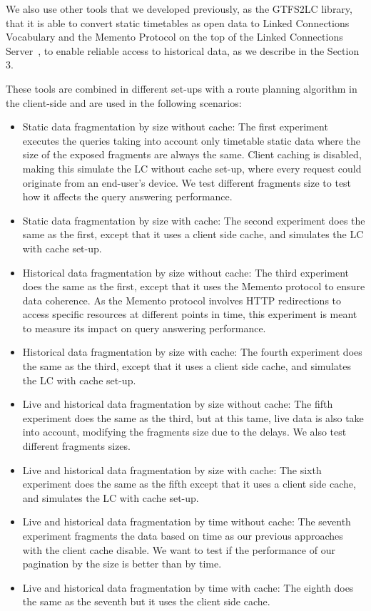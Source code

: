 \documentclass[sw]{iosart2x}
\begin{document}
	We also use other tools that we developed previously, as the GTFS2LC library, that it is able to convert static timetables as open data to Linked Connections Vocabulary and the Memento Protocol on the top of the Linked Connections Server~\cite{rojas2017providing}, to enable reliable access to historical data, as we describe in the Section 3.
	
	These tools are combined in different set-ups with a route planning algorithm in the client-side and are used in the following scenarios:
	\begin{itemize}
	\item Static data fragmentation by size without cache: The first experiment executes the queries taking into account only timetable static data where the size of the exposed fragments are always the same. Client caching is disabled, making this simulate the LC without cache set-up, where every request could originate from an end-user's device. We test different fragments size to test how it affects the query answering performance.
	\item Static data fragmentation by size with cache: The second experiment does the same as the first, except that it uses a client side cache, and simulates the LC with cache set-up.
	\item Historical data fragmentation by size without cache: The third experiment does the same as the first, except that it uses the Memento protocol to ensure data coherence. As the Memento protocol involves HTTP redirections to access specific resources at different points in time, this experiment is meant to measure its impact on query answering performance.
	\item Historical data fragmentation by size with cache: The fourth experiment does the same as the third, except that it uses a client side cache, and simulates the LC with cache set-up.
	\item Live and historical data fragmentation by size without cache: The fifth experiment does the same as the third, but at this tame, live data is also take into account, modifying the fragments size due to the delays. We also test different fragments sizes.
	\item Live and historical data fragmentation by size with cache: The sixth experiment does the same as the fifth except that it uses a client side cache, and simulates the LC with cache set-up.
	\item Live and historical data fragmentation by time without cache: The seventh experiment fragments the data based on time as our previous approaches with the client cache disable. We want to test if the performance of our pagination by the size is better than by time.
	\item Live and historical data fragmentation by time with cache: The eighth does the same as the seventh but it uses the client side cache.
	\end{itemize}
	
\end{document}
